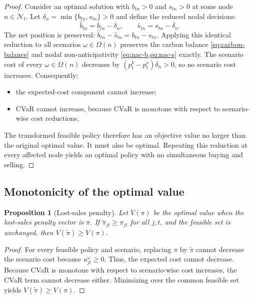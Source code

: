 \documentclass[11pt,a4paper]{article}
\newtheorem{proposition}{Proposition}
\begin{document}
\begin{proof}
Consider an optimal solution with \(b_{tn}>0\) and \(s_{tn}>0\) at some
node \(n\in\mathcal{N}_t\). Let
\(\delta_n=\min\{b_{tn},s_{tn}\}>0\) and define the reduced nodal
decisions:
\[
  \widehat{b}_{tn}=b_{tn}-\delta_n,
  \qquad
  \widehat{s}_{tn}=s_{tn}-\delta_n.
\]
The net position is preserved:
\(\widehat{b}_{tn}-\widehat{s}_{tn}=b_{tn}-s_{tn}\). Applying this
identical reduction to all scenarios \(\omega\in\Omega(n)\) preserves
the carbon balance \cref{eq:carbon-balance} and nodal
non-anticipativity \cref{eq:nac-b,eq:nac-s} exactly. The scenario cost
of every \(\omega\in\Omega(n)\) decreases by
\((p_t^b-p_t^s)\delta_n>0\), so no scenario cost increases.
Consequently:
\begin{itemize}
  \item the expected-cost component cannot increase;
  \item CVaR cannot increase, because CVaR is monotone with respect to
  scenario-wise cost reductions.
\end{itemize}
The transformed feasible policy therefore has an objective value no
larger than the original optimal value. It must also be optimal.
Repeating this reduction at every affected node yields an optimal
policy with no simultaneous buying and selling.
\end{proof}

\subsection{Monotonicity of the optimal value}

\begin{proposition}[Lost-sales penalty]
\label{prop:monotonicity}
Let \(V(\pi)\) be the optimal value when the lost-sales penalty vector
is \(\pi\). If \(\widetilde{\pi}_{jt}\geq\pi_{jt}\) for all \(j,t\),
and the feasible set is unchanged, then
\(V(\widetilde{\pi})\geq V(\pi)\).
\end{proposition}

\begin{proof}
For every feasible policy and scenario, replacing \(\pi\) by
\(\widetilde{\pi}\) cannot decrease the scenario cost because
\(u_{jt}^{\omega}\geq0\). Thus, the expected cost cannot decrease.
Because CVaR is monotone with respect to scenario-wise cost increases,
the CVaR term cannot decrease either. Minimizing over the common
feasible set yields \(V(\widetilde{\pi})\geq V(\pi)\).
\end{proof}
\end{document}
